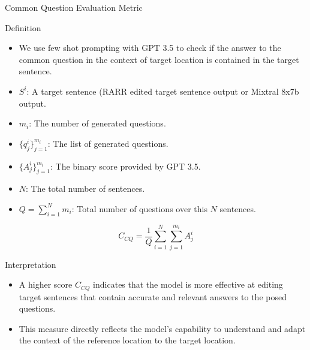 \documentclass{beamer}
\begin{document}
	\begin{frame}{Common Question Evaluation Metric}
		\begin{block}{\scriptsize Definition}\scriptsize
			\begin{itemize}
				\item We use few shot prompting with GPT 3.5 to check if the answer to the common question in the context of target location is contained in the target sentence. 
				\item $S^i$: A target sentence (RARR edited target sentence output or Mixtral 8x7b output.
				\item $m_i$: The number of generated questions.
				\item  $\{q_j^i\}_{j=1}^{m_i}$: The list of generated questions.
				\item $\{A_j^i\}_{j=1}^{m_i}$: The binary score provided by GPT 3.5.
				\item $N$: The total number of sentences.
				\item $Q = \sum_{i=1}^N m_i$: Total number of questions over this $N$ sentences.
			\end{itemize}

			\begin{equation}
				C_{CQ} = \frac{1}{Q} \sum_{i=1}^{N} \sum_{j=1}^{m_i} A_j^i
			\end{equation}
		\end{block}
		\begin{block}{\scriptsize Interpretation}\scriptsize
			\begin{itemize}
				\item A higher score $C_{CQ}$ indicates that the model is more effective at editing target sentences that contain accurate and relevant answers to the posed questions.
				\item This measure directly reflects the model's capability to understand and adapt the context of the reference location to the target location.
			\end{itemize}
		\end{block}
	\end{frame}
	
\end{document}
